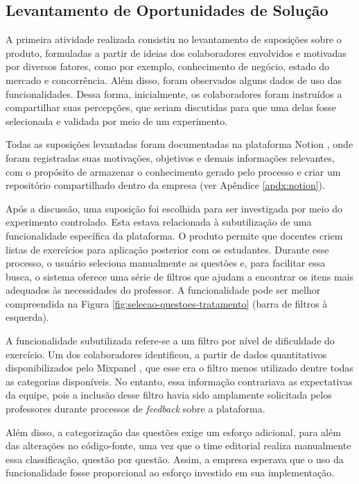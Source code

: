 \subsection{Levantamento de Oportunidades de Solução}

A primeira atividade realizada consistiu no levantamento de suposições sobre o produto, formuladas a partir de ideias dos colaboradores envolvidos e motivadas por diversos fatores, como por exemplo, conhecimento de negócio, estado do mercado e concorrência. Além disso, foram observados alguns dados de uso das funcionalidades. Dessa forma, inicialmente, os colaboradores foram instruídos a compartilhar suas percepções, que seriam discutidas para que uma delas fosse selecionada e validada por meio de um experimento.

Todas as suposições levantadas foram documentadas na plataforma Notion \cite{notion}, onde foram registradas suas motivações, objetivos e demais informações relevantes, com o propósito de armazenar o conhecimento gerado pelo processo e criar um repositório compartilhado dentro da empresa (ver Apêndice \ref{apdx:notion}). 

Após a discussão, uma suposição foi escolhida para ser investigada por meio do experimento controlado. Esta estava relacionada à subutilização de uma funcionalidade específica da plataforma. O produto permite que docentes criem listas de exercícios para aplicação posterior com os estudantes. Durante esse processo, o usuário seleciona manualmente as questões e, para facilitar essa busca, o sistema oferece uma série de filtros que ajudam a encontrar os itens mais adequados às necessidades do professor. A funcionalidade pode ser melhor compreendida na Figura \ref{fig:selecao-questoes-tratamento} (barra de filtros à esquerda).

A funcionalidade subutilizada refere-se a um filtro por nível de dificuldade do exercício. Um dos colaboradores identificou, a partir de dados quantitativos disponibilizados pelo Mixpanel \cite{mixpanel2024}, que esse era o filtro menos utilizado dentre todas as categorias disponíveis. No entanto, essa informação contrariava as expectativas da equipe, pois a inclusão desse filtro havia sido amplamente solicitada pelos professores durante processos de \textit{feedback} sobre a plataforma.

Além disso, a categorização das questões exige um esforço adicional, para além das alterações no código-fonte, uma vez que o time editorial realiza manualmente essa classificação, questão por questão. Assim, a empresa esperava que o uso da funcionalidade fosse proporcional ao esforço investido em sua implementação.

